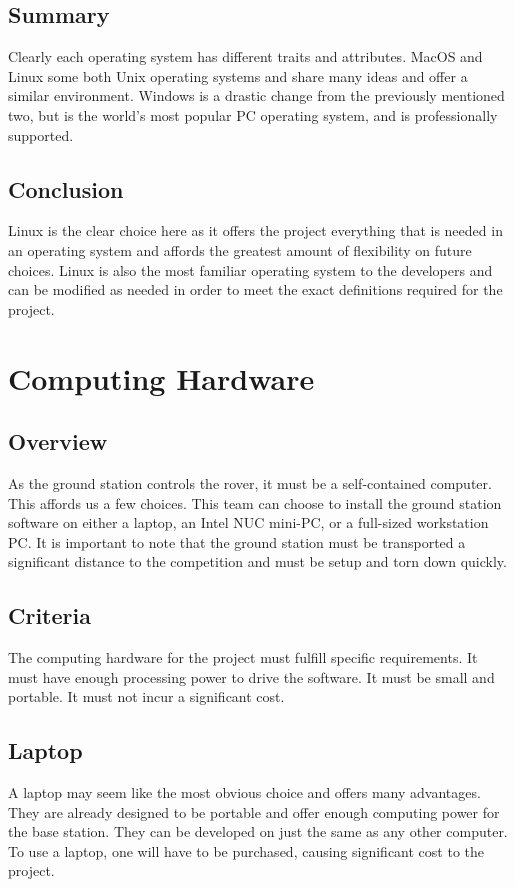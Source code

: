 \documentclass[onecolumn, draftclsnofoot, 10pt, compsoc]{IEEEtran}
\begin{document}
\subsection{Summary}
Clearly each operating system has different traits and attributes.
MacOS and Linux some both Unix operating systems and share many ideas and offer a similar environment.
Windows is a drastic change from the previously mentioned two, but is the world's most popular PC operating system, and is professionally supported.

\subsection{Conclusion}
Linux is the clear choice here as it offers the project everything that is needed in an operating system and affords the greatest amount of flexibility on future choices.
Linux is also the most familiar operating system to the developers and can be modified as needed in order to meet the exact definitions required for the project.

\section{Computing Hardware}
\subsection{Overview}
As the ground station controls the rover, it must be a self-contained computer.
This affords us a few choices.
This team can choose to install the ground station software on either a laptop, an Intel NUC mini-PC, or a full-sized workstation PC.
It is important to note that the ground station must be transported a significant distance to the competition and must be setup and torn down quickly.

\subsection{Criteria}
The computing hardware for the project must fulfill specific requirements.
It must have enough processing power to drive the software.
It must be small and portable.
It must not incur a significant cost.

\subsection{Laptop}
A laptop may seem like the most obvious choice and offers many advantages.
They are already designed to be portable and offer enough computing power for the base station.
They can be developed on just the same as any other computer.
To use a laptop, one will have to be purchased, causing significant cost to the project.
\end{document}
